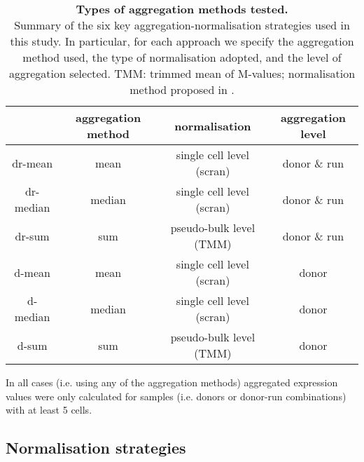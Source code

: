\begin{table}[h]
    \centering
    \begin{tabular}{c|c c c}
    &       aggregation method & normalisation & aggregation level  \\
    \hline
    dr-mean    & mean   & single cell level (scran) &  donor \& run \\
    dr-median  & median & single cell level (scran) &  donor \& run \\
    dr-sum     & sum    & pseudo-bulk level (TMM) &  donor \& run \\
    d-mean     & mean   & single cell level (scran) &  donor \\
    d-median   & median & single cell level (scran) &  donor \\
    d-sum      & sum    & pseudo-bulk level (TMM) &  donor \\
    \end{tabular}
    \caption[Aggregation methods used]{\textbf{Types of aggregation methods tested.}\\
    Summary of the six key aggregation-normalisation strategies used in this study. 
    In particular, for each approach we specify the aggregation method used, the type of normalisation adopted, and the level of aggregation selected.
    TMM: trimmed mean of M-values; normalisation method proposed in \cite{robinson2010scaling}.}
    \label{tab:sc_eqtl_aggregations}
\end{table}

In all cases (i.e. using any of the aggregation methods) aggregated expression values were only calculated for samples (i.e. donors or donor-run combinations) with at least 5 cells.

\newpage

\subsection{Normalisation strategies}

